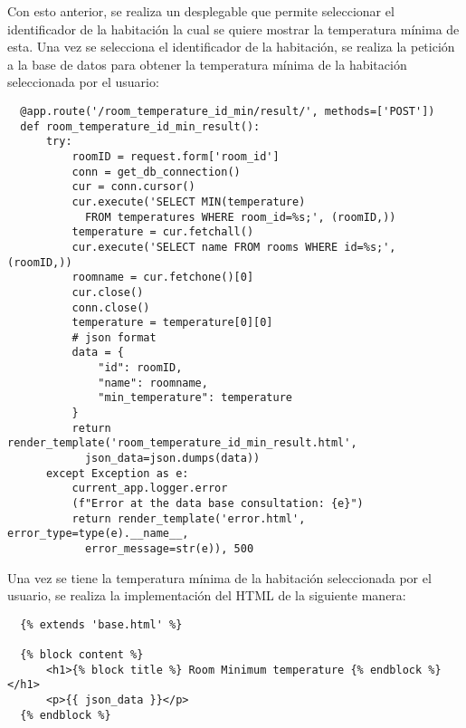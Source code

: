 \documentclass[11pt]{report}
\begin{document}
Con esto anterior, se realiza un desplegable que permite seleccionar el identificador de la habitación la cual se quiere mostrar la temperatura mínima  de esta. Una vez se selecciona el identificador de la habitación, se realiza la petición a la base de datos para obtener la temperatura mínima de la habitación seleccionada por el usuario:

\begin{verbatim}
  @app.route('/room_temperature_id_min/result/', methods=['POST'])
  def room_temperature_id_min_result():
      try:
          roomID = request.form['room_id']
          conn = get_db_connection()
          cur = conn.cursor()
          cur.execute('SELECT MIN(temperature) 
            FROM temperatures WHERE room_id=%s;', (roomID,))
          temperature = cur.fetchall()
          cur.execute('SELECT name FROM rooms WHERE id=%s;', (roomID,))
          roomname = cur.fetchone()[0]
          cur.close()
          conn.close()
          temperature = temperature[0][0]
          # json format
          data = {
              "id": roomID,
              "name": roomname,
              "min_temperature": temperature
          }
          return render_template('room_temperature_id_min_result.html', 
            json_data=json.dumps(data))
      except Exception as e:
          current_app.logger.error
          (f"Error at the data base consultation: {e}")
          return render_template('error.html', error_type=type(e).__name__, 
            error_message=str(e)), 500
\end{verbatim}

Una vez se tiene la temperatura mínima de la habitación seleccionada por el usuario, se realiza la implementación del HTML de la siguiente manera:

\begin{verbatim}
  {% extends 'base.html' %}

  {% block content %}
      <h1>{% block title %} Room Minimum temperature {% endblock %}</h1>
      <p>{{ json_data }}</p>
  {% endblock %}
\end{verbatim}
\end{document}
